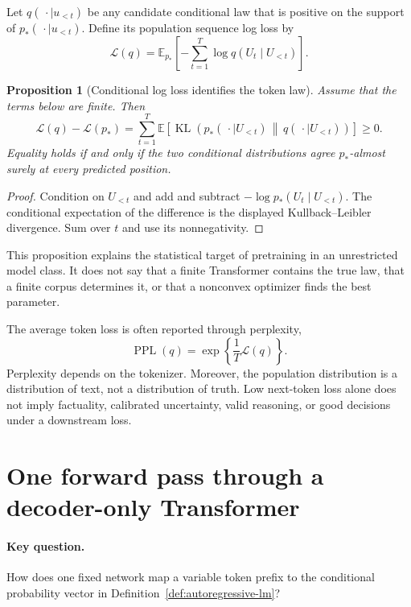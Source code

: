 \documentclass[11pt]{amsart}
\numberwithin{equation}{section}
\theoremstyle{definition}
\theoremstyle{plain}
\newtheorem{proposition}[definition]{Proposition}
\theoremstyle{remark}
\newcommand{\E}{\mathbb{E}}
\newcommand{\cL}{\mathcal{L}}
\DeclareMathOperator{\KL}{KL}
\begin{document}
Let $q(\,\cdot\mid u_{<t})$ be any candidate conditional law that is positive
on the support of $p_*(\,\cdot\mid u_{<t})$.  Define its population sequence
log loss by
\begin{equation}\label{eq:population-log-loss}
 \cL(q)
 =
 \E_{p_*}\left[
   -\sum_{t=1}^T\log q(U_t\mid U_{<t})
 \right].
\end{equation}

\begin{proposition}[Conditional log loss identifies the token law]
\label{prop:log-loss-kl}
Assume that the terms below are finite.  Then
\begin{equation}\label{eq:conditional-kl-sum}
 \cL(q)-\cL(p_*)
 =
 \sum_{t=1}^T
 \E\!\left[
   \KL\!\left(
     p_*(\,\cdot\mid U_{<t})
     \,\middle\|\,
     q(\,\cdot\mid U_{<t})
   \right)
 \right]
 \ge 0.
\end{equation}
Equality holds if and only if the two conditional distributions agree
$p_*$-almost surely at every predicted position.
\end{proposition}

\begin{proof}
Condition on $U_{<t}$ and add and subtract
$-\log p_*(U_t\mid U_{<t})$.  The conditional expectation of the difference is
the displayed Kullback--Leibler divergence.  Sum over $t$ and use its
nonnegativity.
\end{proof}

This proposition explains the statistical target of pretraining in an
unrestricted model class.  It does not say that a finite Transformer contains
the true law, that a finite corpus determines it, or that a nonconvex optimizer
finds the best parameter.

The average token loss is often reported through perplexity,
\[
 \operatorname{PPL}(q)
 =\exp\!\left\{\frac{1}{T}\cL(q)\right\}.
\]
Perplexity depends on the tokenizer.  Moreover, the population distribution is
a distribution of text, not a distribution of truth.  Low next-token loss
alone does not imply factuality, calibrated uncertainty, valid reasoning, or
good decisions under a downstream loss.


\section{One forward pass through a decoder-only Transformer}
\label{sec:transformer-forward}

\paragraph{\textbf{Key question.}}
How does one fixed network map a variable token prefix to the conditional
probability vector in Definition~\ref{def:autoregressive-lm}?
\end{document}
